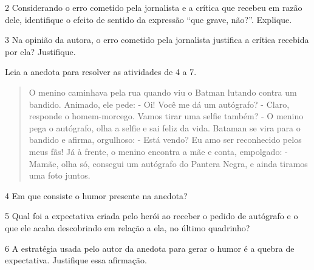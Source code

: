 \num{2} Considerando o erro cometido pela jornalista e a crítica que
recebeu em razão dele, identifique o efeito de sentido da expressão
``que grave, não?''. Explique.


\num{3} Na opinião da autora, o erro cometido pela jornalista justifica
a crítica recebida por ela? Justifique.


Leia a anedota para resolver as atividades de 4 a 7.

\begin{quote}
O menino caminhava pela rua quando viu o Batman lutando contra um bandido. Animado, ele pede:
- Oi! Você me dá um autógrafo?
- Claro, responde o homem-morcego. Vamos tirar uma selfie também?
- O menino pega o autógrafo, olha a selfie e sai feliz da vida.
Bataman se vira para o bandido e afirma, orgulhoso:
- Está vendo? Eu amo ser reconhecido pelos meus fãs!
Já à frente, o menino encontra a mãe e conta, empolgado:
- Mamãe, olha só, consegui um autógrafo do Pantera Negra, e ainda tiramos uma foto juntos.
\end{quote}

\num{4} Em que consiste o humor presente na anedota?


\num{5} Qual foi a expectativa criada pelo herói ao receber o pedido de
autógrafo e o que ele acaba descobrindo em relação a ela, no último
quadrinho?


\num{6} A estratégia usada pelo autor da anedota para gerar o humor é a
quebra de expectativa. Justifique essa afirmação.


